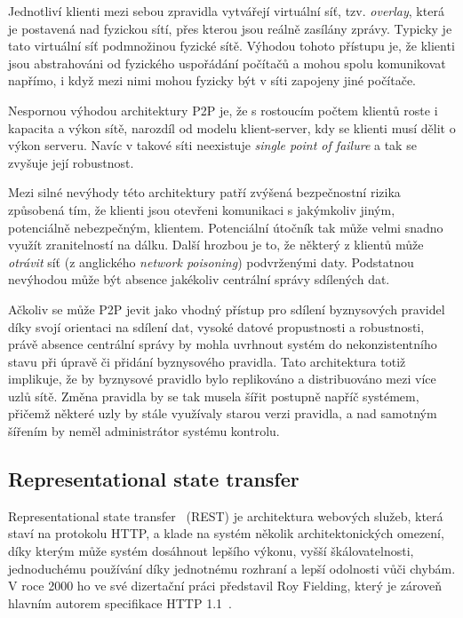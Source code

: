 Jednotliví klienti mezi sebou zpravidla vytvářejí virtuální síť, tzv. \textit{overlay},
která je postavená nad fyzickou sítí, přes kterou jsou reálně zasílány zprávy.
Typicky je tato virtuální síť podmnožinou fyzické sítě. Výhodou tohoto přístupu je,
že klienti jsou abstrahováni od fyzického uspořádání počítačů a mohou spolu komunikovat napřímo,
i když mezi nimi mohou fyzicky být v síti zapojeny jiné počítače.

Nespornou výhodou architektury \gls{P2P} je, že s rostoucím počtem klientů roste i
kapacita a výkon sítě, narozdíl od modelu klient-server, kdy se klienti musí dělit o výkon serveru.
Navíc v takové síti neexistuje \textit{single point of failure} a tak se zvyšuje její robustnost.

Mezi silné nevýhody této architektury patří zvýšená bezpečnostní rizika způsobená tím,
že klienti jsou otevřeni komunikaci s jakýmkoliv jiným, potenciálně nebezpečným, klientem.
Potenciální útočník tak může velmi snadno využít zranitelností na dálku.
Další hrozbou je to, že některý z klientů může \textit{otrávit} síť
(z anglického \textit{network poisoning}) podvrženými daty.
Podstatnou nevýhodou může být absence jakékoliv centrální správy sdílených dat.

Ačkoliv se může \gls{P2P} jevit jako vhodný přístup pro sdílení byznysových pravidel
díky svojí orientaci na sdílení dat, vysoké datové propustnosti a robustnosti, právě absence
centrální správy by mohla uvrhnout systém do nekonzistentního stavu při úpravě či přidání
byznysového pravidla. Tato architektura totiž implikuje, že by byznysové pravidlo bylo
replikováno a distribuováno mezi více uzlů sítě. Změna pravidla by se tak musela šířit postupně
napříč systémem, přičemž některé uzly by stále využívaly starou verzi pravidla, a nad samotným
šířením by neměl administrátor systému kontrolu.

\subsection{Representational state transfer}\label{sec:rest}

Representational state transfer~\cite{fielding2000rest} (\gls{REST}) je architektura
webových služeb, která staví na protokolu \gls{HTTP}, a klade na systém
několik architektonických omezení, díky kterým může systém dosáhnout
lepšího výkonu, vyšší škálovatelnosti, jednoduchému používání díky jednotnému rozhraní
a lepší odolnosti vůči chybám. V roce 2000 ho ve své dizertační práci představil Roy Fielding,
který je zároveň hlavním autorem specifikace \gls{HTTP} 1.1~\cite{fielding1999hypertext}.

